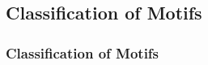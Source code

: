 \documentclass{beamer}
\newcommand\Paper[3]{%
\begin{textblock*}{.98\textwidth}(5pt,.98\textheight)%
 \begin{spacing}{.5} 
{\sc\scriptsize \textsl{``\raggedright #1''};
{\tiny #2; (#3)}}
\end{spacing}
\end{textblock*}}
\begin{document}
% 

\subsection{Classification of Motifs}
\begin{frame}\frametitle{Classification of Motifs}
\end{frame}
\end{document}
